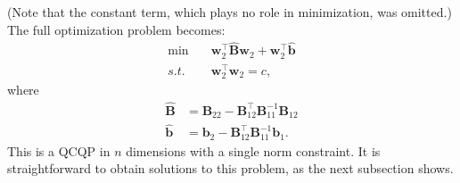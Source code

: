 \documentclass[journal,twoside]{IEEEtran}
\renewcommand{\vec}[1]{\mathbf{#1}}
\begin{document}
(Note that the constant term, which plays no role in minimization, was omitted.) The full optimization problem becomes:
\begin{subequations}\label{eq:eliminated}
\begin{align}
\min\quad & \vec{w}_2^\top \hat{\mathbf{B}}\vec{w}_2 + \vec{w}_2^\top \hat{\vec{b}} \\
\label{eq:eliminated-quad} s.t.\quad & \vec{w}_2^\top \vec{w}_2 = c,
\end{align}
\end{subequations}
where
\begin{align*}
\hat{\mathbf{B}} &= \mathbf{B}_{22} - \mathbf{B}_{12}^\top \mathbf{B}_{11}^{-1}\mathbf{B}_{12} \\
\hat{\vec{b}} &= \vec{b}_2 - \mathbf{B}_{12}^\top \mathbf{B}_{11}^{-1}\vec{b}_1.
\end{align*}
This is a QCQP in $n$ dimensions with a single norm constraint. It is
straightforward to obtain solutions to this problem, as the next
subsection shows.
\end{document}

